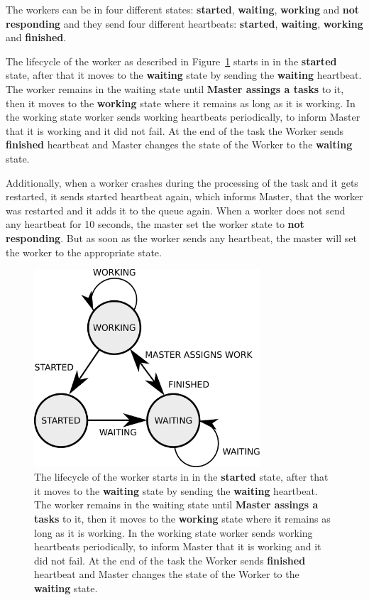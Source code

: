 The workers can be in four different states:
  \textbf{started}, \textbf{waiting}, \textbf{working} and \textbf{not responding}
  and they send four different heartbeats:
  \textbf{started}, \textbf{waiting}, \textbf{working} and \textbf{finished}.

The lifecycle of the worker as described in Figure~\ref{fig:worker-state} starts in in the \textbf{started} state,
  after that it moves to the \textbf{waiting} state by sending the \textbf{waiting} heartbeat.
The worker remains in the waiting state until \textbf{Master assings a tasks} to it,
  then it moves to the \textbf{working} state
  where it remains as long as it is working.
In the working state worker sends working heartbeats periodically,
  to inform Master that it is working and it did not fail.
At the end of the task the Worker sends \textbf{finished} heartbeat
  and Master changes the state of the Worker to the \textbf{waiting} state.

Additionally, when a worker crashes during the processing of the task and it gets restarted,
  it sends started heartbeat again,
  which informs Master, that the worker was restarted and it adds it to the queue again.
When a worker does not send any heartbeat for 10 seconds,
  the master set the worker state to \textbf{not responding}.
But as soon as the worker sends any heartbeat,
  the master will set the worker to the appropriate state.

\begin{figure}[h]
  \centering
  \includegraphics[width=0.75\textwidth]{./img/worker-state.pdf}

  \caption{
    The lifecycle of the worker starts in in the \textbf{started} state,
      after that it moves to the \textbf{waiting} state by sending the \textbf{waiting} heartbeat.
    The worker remains in the waiting state until \textbf{Master assings a tasks} to it,
      then it moves to the \textbf{working} state
      where it remains as long as it is working.
    In the working state worker sends working heartbeats periodically,
      to inform Master that it is working and it did not fail.
    At the end of the task the Worker sends \textbf{finished} heartbeat
      and Master changes the state of the Worker to the \textbf{waiting} state.
  }
  \label{fig:worker-state}
\end{figure}

